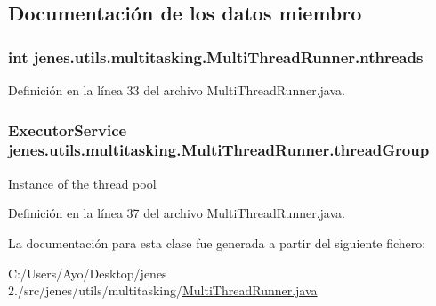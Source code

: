 \subsection{Documentación de los datos miembro}
\hypertarget{classjenes_1_1utils_1_1multitasking_1_1_multi_thread_runner_aa20fe700a6b2abd3694b4a1d5629db8f}{
\subsubsection[{nthreads}]{\setlength{\rightskip}{0pt plus 5cm}int jenes.\-utils.\-multitasking.\-Multi\-Thread\-Runner.\-nthreads\hspace{0.3cm}{\ttfamily [protected]}}}\label{classjenes_1_1utils_1_1multitasking_1_1_multi_thread_runner_aa20fe700a6b2abd3694b4a1d5629db8f}


Definición en la línea 33 del archivo Multi\-Thread\-Runner.\-java.

\hypertarget{classjenes_1_1utils_1_1multitasking_1_1_multi_thread_runner_afd9939cc7a261bd4bb6c8f3de6f58337}{
\subsubsection[{thread\-Group}]{\setlength{\rightskip}{0pt plus 5cm}Executor\-Service jenes.\-utils.\-multitasking.\-Multi\-Thread\-Runner.\-thread\-Group\hspace{0.3cm}{\ttfamily [protected]}}}\label{classjenes_1_1utils_1_1multitasking_1_1_multi_thread_runner_afd9939cc7a261bd4bb6c8f3de6f58337}
Instance of the thread pool 

Definición en la línea 37 del archivo Multi\-Thread\-Runner.\-java.



La documentación para esta clase fue generada a partir del siguiente fichero\-:\begin{DoxyCompactItemize}
\item 
C\-:/\-Users/\-Ayo/\-Desktop/jenes 2./src/jenes/utils/multitasking/\hyperlink{_multi_thread_runner_8java}{Multi\-Thread\-Runner.\-java}\end{DoxyCompactItemize}
